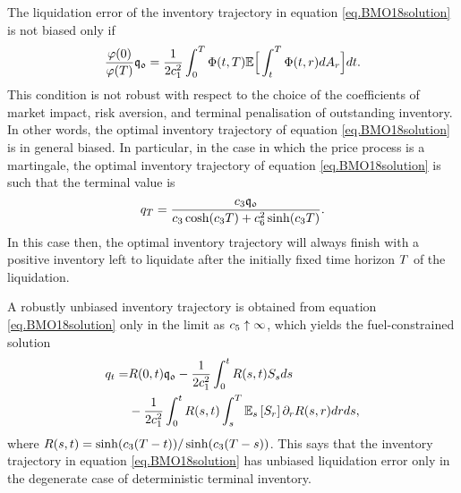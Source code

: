 \documentclass[10pt,a4paper]{article}
\begin{document}
The liquidation error of the inventory trajectory in equation \eqref{eq.BMO18solution} is not biased only if 
\begin{equation*}
\frac{\varphi(0)}{\varphi(T)}\mathfrak{q_0} 
= \frac{1}{2c_{1}^{2}} \int_{0}^{T} \Phi(t,T)\mathbb{{E}} \Big[\int_{t}^{T} \Phi(t,r)dA_r\Big]dt. 
\end{equation*}
This condition is not robust with respect to the choice of the coefficients of market impact, risk aversion, and terminal penalisation of outstanding inventory. In other words, the optimal inventory trajectory of equation \eqref{eq.BMO18solution} is in general biased. In particular, in the case in which the price process is a martingale, the optimal inventory trajectory of equation \eqref{eq.BMO18solution} is such that the terminal value is 
\begin{equation*}
q_T = \frac{c_{3} \mathfrak{q_0}}{c_{3} \cosh (c_{3} T ) + c_{6}^{2} \sinh(c_{3} T)}.
\end{equation*}
In this case then, the optimal inventory trajectory will always finish with a positive inventory left to liquidate after the initially fixed time horizon $T$ of the liquidation. 

A robustly unbiased inventory trajectory is obtained from equation \eqref{eq.BMO18solution} only in the limit as $c_{5} \uparrow \infty$, which yields the fuel-constrained solution 
\begin{equation*}
\begin{split}
q_t =& R(0,t)\mathfrak{q_0} - \frac{1}{2c_{1}^{2}} \int_{0}^{t} R(s,t)S_s ds \\ 
& - \frac{1}{2c_{1}^{2}} \int_{0}^{t} R(s,t) \int_{s}^{T} \mathbb{{E}}_s \left[ S_r\right] \partial_r R(s,r) dr ds,
\end{split}
\end{equation*}
where $R(s,t)= \sinh(c_{3} (T - t)) / \sinh(c_{3} (T - s))$. This says that the inventory trajectory in equation \eqref{eq.BMO18solution} has unbiased liquidation error only in the degenerate case of deterministic terminal inventory. 
\end{document}
